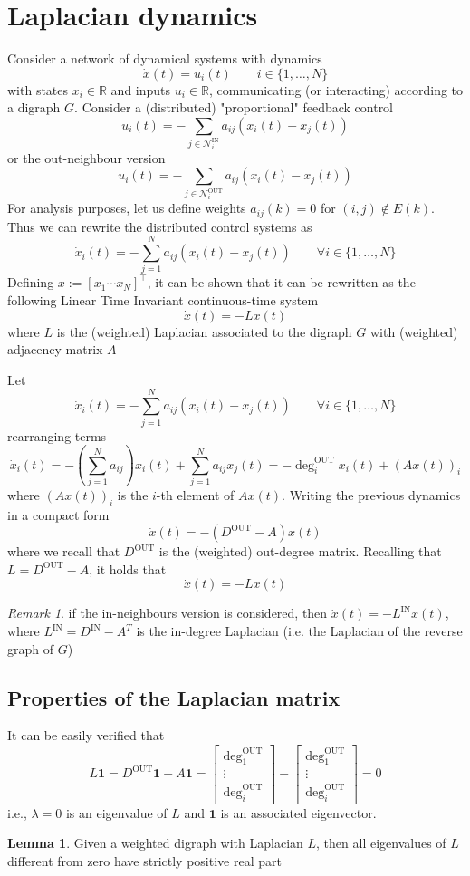 \documentclass{book}
\newcommand{\R}{\mathbb{R}}
\theoremstyle{theoremv2}
\theoremstyle{defv2}
\theoremstyle{remark}
\newtheorem*{remark}{Remark}
\theoremstyle{remark}
\theoremstyle{definition}
\newtheorem*{lemma}{Lemma}
\theoremstyle{definition}
\begin{document}
\section{Laplacian dynamics}
Consider a network of dynamical systems with dynamics 
\[
    \dot{x}(t) = u_i(t) \qquad i \in \{1,\dots,N\}
\]
with states $x_i\in\R$ and inputs $u_i\in\R$, communicating (or interacting) according to a digraph $G$. Consider a (distributed) "proportional" feedback control 
\[
    u_i(t) = - \displaystyle\sum_{j\in\mathcal{N}_i^{\text{IN}}}a_{ij}(x_i(t)-x_j(t))
\]
or the out-neighbour version
\[
    u_i(t) = - \displaystyle\sum_{j\in\mathcal{N}_i^{\text{OUT}}}a_{ij}(x_i(t)-x_j(t))
\]
For analysis purposes, let us define weights $a_{ij}(k)=0$ for $(i,j)\notin E(k)$. Thus we can rewrite the distributed control systems as 
\[
    \dot{x}_i(t) = - \displaystyle\sum_{j=1}^{N} a_{ij} (x_i(t)-x_j(t)) \qquad \forall i\in\{1,\dots,N\}
\]
Defining $x:=[x_1 \cdots x_N]^\top$, it can be shown that it can be rewritten as the following Linear Time Invariant continuous-time system 
\[
    \dot{x}(t) = -Lx(t)
\]
where $L$ is the (weighted) Laplacian associated to the digraph $G$ with (weighted) adjacency matrix $A$ 

Let 
\[
    \dot{x}_i(t) = - \displaystyle\sum_{j=1}^{N} a_{ij} (x_i(t)-x_j(t)) \qquad \forall i\in\{1,\dots,N\}
\]
rearranging terms 
\[
    \dot{x}_i(t) = -\left(\displaystyle\sum_{j=1}^{N} a_{ij}\right) x_i(t) + \displaystyle\sum_{j=1}^{N} a_{ij}x_j(t) = -\deg_i^{\text{OUT}}x_i(t)+ (Ax(t))_i
\]
where $(Ax(t))_i$ is the $i$-th element of $Ax(t)$. Writing the previous dynamics in a compact form 
\[
    \dot{x}(t) = -(D^{\text{OUT}}-A)x(t)
\]
where we recall that $D^{\text{OUT}}$ is the (weighted) out-degree matrix. Recalling that $L=D^{\text{OUT}}-A$, it holds that 
\[
    \dot{x}(t) = -Lx(t)
\]
\begin{remark}
    if the in-neighbours version is considered, then $\dot{x}(t) = -L^{\text{IN}}x(t)$, where $L^{\text{IN}}=D^{\text{IN}}-A^T$ is the in-degree Laplacian (i.e. the Laplacian of the reverse graph of $G$)
\end{remark}
\subsection{Properties of the Laplacian matrix}
It can be easily verified that 
\[
    L\mathbf{1} = D^{\text{OUT}}\mathbf{1}-A\mathbf{1} = \begin{bmatrix}
        \deg_1^{\text{OUT}} \\ \vdots \\ \deg_i^{\text{OUT}}
    \end{bmatrix} - \begin{bmatrix}
        \deg_1^{\text{OUT}} \\ \vdots \\ \deg_i^{\text{OUT}}
    \end{bmatrix} = 0
\]
i.e., $\lambda=0$ is an eigenvalue of $L$ and $\mathbf{1}$ is an associated eigenvector.
\begin{lemma}
    Given a weighted digraph with Laplacian $L$, then all eigenvalues of $L$ different from zero have strictly positive real part
\end{lemma}
\end{document}
